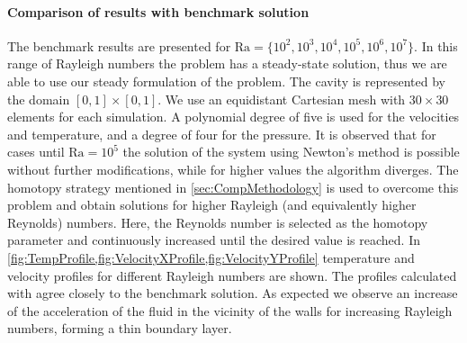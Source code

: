 {\paragraph{Comparison of results with benchmark solution}
The benchmark results \cite{vierendeelsBenchmarkSolutionsNatural2003} are presented for $\text{Ra} = \{10^2,10^3,10^4,10^5,10^6,10^7\}$. In this range of Rayleigh numbers the problem has a steady-state solution, thus we are able to use our steady formulation of the problem. The cavity is represented by the domain $[0,1]\times[0,1]$. We use an equidistant Cartesian mesh with $30 \times 30$ elements for each simulation. A polynomial degree of five is used for the velocities and temperature, and a degree of four for the pressure. 
It is observed that for cases until  $\text{Ra} = 10^5$ the solution of the system using Newton's method is possible without further modifications, while for higher values the algorithm diverges. The homotopy strategy mentioned in \cref{sec:CompMethodology} is used to overcome this problem and obtain solutions for higher Rayleigh (and equivalently higher Reynolds) numbers. Here, the Reynolds number is selected as the homotopy parameter and continuously increased until the desired value is reached.
In \cref{fig:TempProfile,fig:VelocityXProfile,fig:VelocityYProfile} temperature and velocity profiles for different Rayleigh numbers are shown. The profiles calculated with \BoSSS agree closely to the benchmark solution. As expected we observe 
an increase of the acceleration of the fluid in the vicinity of the walls for increasing Rayleigh numbers, forming a thin boundary layer. 



}
